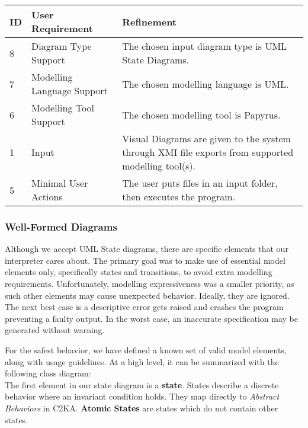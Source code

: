 \documentclass[11pt]{article}
\begin{document}
    \begin{table}[htbp]
    \centering
    \begin{tabularx}{\textwidth}{| l | l | X |}
        \hline
        \textbf{ID} & \textbf{User Requirement} & \textbf{Refinement} \\
        \hline
        8 & Diagram Type Support & The chosen input diagram type is UML State Diagrams. \\ \hline
        7 & Modelling Language Support & The chosen modelling language is UML. \\ \hline
        6 & Modelling Tool Support & The chosen modelling tool is Papyrus. \\ \hline
        1 & Input & Visual Diagrams are given to the system through XMI file exports from supported modelling tool(s). \\ \hline
        5 & Minimal User Actions & The user puts files in an input folder, then executes the program.  \\ \hline
    \end{tabularx}\label{tab:input-table}
    \end{table}

    \subsubsection{Well-Formed Diagrams}\label{subsubsec:input-example}
    Although we accept UML State diagrams, there are specific elements that our interpreter cares about.
    The primary goal was to make use of essential model elements only, specifically states and transitions,
    to avoid extra modelling requirements.
    Unfortunately, modelling expressiveness was a smaller priority, as such
    other elements may cause unexpected behavior.
    Ideally, they are ignored.
    The next best case is a descriptive error gets raised and crashes the program preventing a faulty output.
    In the worst case, an inaccurate specification may be generated without warning.

    For the safest behavior, we have defined a known set of valid model elements, along with usage guidelines.
    At a high level, it can be summarized with the following class diagram:
    \\

    The first element in our state diagram is a \textbf{state}.
    States describe a discrete behavior where an invariant condition holds.
    They map directly to \textit{Abstract Behaviors} in C2KA\@.
    \textbf{Atomic States} are states which do not contain other states.
\end{document}
